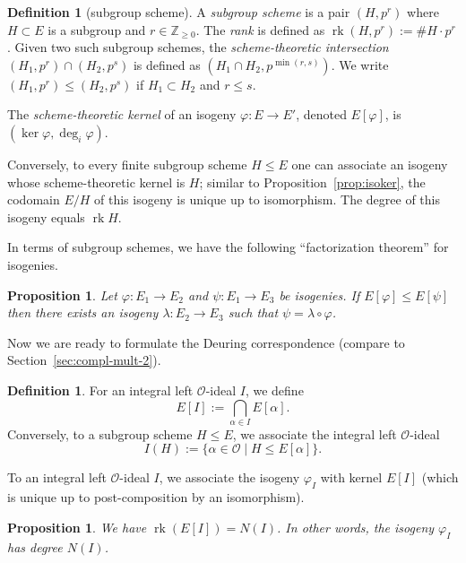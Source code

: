 \documentclass[10pt]{article}
\theoremstyle{plain}
\newtheorem{proposition}[theorem]{Proposition}
\theoremstyle{definition}
\newtheorem{definition}[theorem]{Definition}
\DeclareMathOperator{\rk}{rk} %
\def\Z{\ensuremath{\mathbb{Z}}}
\def\O{\ensuremath{\mathcal{O}}}
\begin{document}
\begin{definition}[subgroup scheme]
A \emph{subgroup scheme} is a pair $(H,p^r)$
where $H\subset E$ is a subgroup and $r\in\Z_{\geq 0}$.
The \emph{rank} is defined as $\rk(H,p^r) := \# H \cdot p^r$.
Given two such subgroup schemes, the \emph{scheme-theoretic intersection}
$(H_1,p^r)\cap (H_2,p^s)$ is defined as $(H_1\cap H_2, p^{\min(r,s)})$.
We write $(H_1,p^r)\leq (H_2,p^s)$ if $H_1\subset H_2$ and $r\leq s$.

The \emph{scheme-theoretic kernel} of an isogeny $\varphi: E\to E'$,
denoted $E[\varphi]$, is $(\ker\varphi,\deg_i\varphi)$.
\end{definition}

Conversely, to every finite subgroup scheme $H\leq E$
one can associate an isogeny whose scheme-theoretic kernel is $H$;
similar to Proposition~\ref{prop:isoker}, the codomain $E/H$
of this isogeny is unique up to isomorphism.
The degree of this isogeny equals $\rk H$.

In terms of subgroup schemes, we have the following ``factorization theorem''
for isogenies.

\begin{proposition}
Let $\varphi:E_1\to E_2$ and $\psi:E_1\to E_3$ be isogenies.
If $E[\varphi]\leq E[\psi]$ then there exists an isogeny
$\lambda:E_2\to E_3$ such that $\psi = \lambda\circ\varphi$.
\end{proposition}

Now we are ready to formulate the Deuring correspondence (compare to
Section~\ref{sec:compl-mult-2}).

\begin{definition}
For an integral left $\O$-ideal $I$, we define
\begin{equation*}
    E[I] := \bigcap_{\alpha\in I} E[\alpha].
\end{equation*}
Conversely, to a subgroup scheme $H\leq E$,
we associate the integral left $\O$-ideal 
\begin{equation*}
    I(H) := \{\alpha\in\O\mid H\leq E[\alpha]\}.
\end{equation*}
\end{definition}

To an integral left $\O$-ideal $I$, we associate the isogeny $\varphi_I$
with kernel $E[I]$ (which is unique up to post-composition by an
isomorphism).

\begin{proposition}
We have $\rk(E[I]) = N(I)$. In other words,
the isogeny $\varphi_I$ has degree $N(I)$.
\end{proposition}
\end{document}
